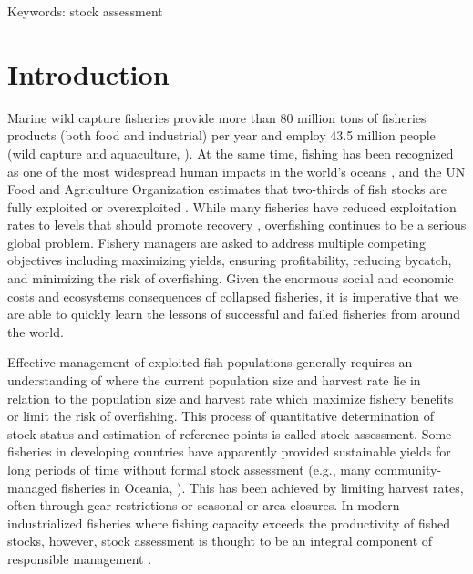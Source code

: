 \documentclass[letterpaper,12pt]{article}
\begin{document}
Keywords: stock assessment
\newpage
\section{Introduction}

Marine wild capture fisheries provide more than 80 million tons of
fisheries products (both food and industrial) per year and employ 43.5
million people (wild capture and aquaculture, \citet{FAO:fishstat}).  At the same
time, fishing has been recognized as one of the most widespread human
impacts in the world's oceans \citep{Halpern:etal:2008:science}, and
the UN Food and Agriculture Organization estimates that two-thirds of
fish stocks are fully exploited or overexploited \citep{FAO:fishstat}.  While
many fisheries have reduced exploitation rates to levels that should
promote recovery \citep{Worm:etal:2009:science}, overfishing continues
to be a serious global problem.  Fishery managers are asked to address
multiple competing objectives including maximizing yields, ensuring
profitability, reducing bycatch, and minimizing the risk of
overfishing.  Given the enormous social and economic costs
\citep{Rice:etal:2003:icescm} and ecosystems consequences
\citep{Frank:etal:2005:science, Myers:etal:2007:science} of collapsed
fisheries, it is imperative that we are able to quickly learn the
lessons of successful and failed fisheries from around the world.

Effective management of exploited fish populations generally requires
an understanding of where the current population size and harvest rate
lie in relation to the population size and harvest rate which maximize
fishery benefits or limit the risk of overfishing.  This process of
quantitative determination of stock status and estimation of reference
points is called stock assessment.  Some fisheries in developing
countries have apparently provided sustainable yields for long periods
of time without formal stock assessment (e.g., many community-managed
fisheries in Oceania, \citet{Johannes:2002:arees}).  This has been achieved by
limiting harvest rates, often through gear restrictions or seasonal or
area closures.  In modern industrialized fisheries where fishing
capacity exceeds the productivity of fished stocks, however, stock
assessment is thought to be an integral component of responsible
management \citep{Hilborn:Walters:1992}.
\end{document}
